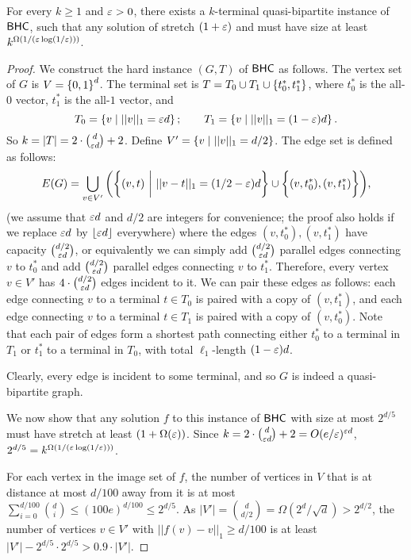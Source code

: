 \begin{lemma}
For every $k\ge 1$ and ${\varepsilon}>0$, there exists a $k$-terminal quasi-bipartite instance of $\textnormal{\textsf{BHC}}$, such that any solution of stretch $(1+{\varepsilon})$ and must have size at least $k^{\Omega(1/({\varepsilon}\log (1/{\varepsilon})))}$.
\end{lemma}

\begin{proof}
We construct the hard instance $(G,T)$ of $\textnormal{\textsf{BHC}}$  as follows. The vertex set of $G$ is $V=\left\{ 0,1 \right\}^d$. The terminal set is $T=T_0\cup T_1\cup \left\{ t^*_0,t^*_1 \right\}$, where $t^*_0$ is the all-$0$ vector, $t^*_1$ is the all-$1$ vector, and
\[
T_0=\left\{ v\mid ||v||_1={\varepsilon} d \right\}; \quad\quad T_1=\left\{ v\mid ||v||_1=(1-{\varepsilon}) d \right\}.
\]
So $k=|T|=2\cdot\binom{d}{{\varepsilon} d}+2$. Define $V'=\left\{ v\mid ||v||_1= d/2 \right\}$. The edge set is defined as follows:
\[
E(G)=\bigcup_{v\in V'}\bigg(\bigg\{(v,t)\text{ }\bigg|\text{ } ||v-t||_1=(1/2-{\varepsilon})d\bigg\}\cup \bigg\{(v,t^*_0),(v,t^*_1)\bigg\}\bigg),
\]
(we assume that ${\varepsilon} d$ and $d/2$ are integers for convenience; the proof also holds if we replace ${\varepsilon} d$ by $\left\lfloor {\varepsilon} d \right\rfloor$ everywhere)
where the edges $(v,t^*_0),(v,t^*_1)$ have capacity $\binom{d/2}{{\varepsilon} d}$, or equivalently we can simply add $\binom{d/2}{{\varepsilon} d}$ parallel edges connecting $v$ to $t^*_0$ and add $\binom{d/2}{{\varepsilon} d}$ parallel edges connecting $v$ to $t^*_1$. Therefore, every vertex $v\in V'$ has $4\cdot \binom{d/2}{{\varepsilon} d}$ edges incident to it. We can pair these edges as follows: each edge connecting $v$ to a terminal $t\in T_0$ is paired with a copy of $(v,t^*_1)$, and each edge connecting $v$ to a terminal $t\in T_1$ is paired with a copy of $(v,t^*_0)$. Note that each pair of edges form a shortest path connecting either $t^*_0$ to a terminal in $T_1$ or $t^*_1$ to a terminal in $T_0$, with total $\ell_1$-length $(1-{\varepsilon})d$.

Clearly, every edge is incident to some terminal, and so $G$ is indeed a quasi-bipartite graph.


We now show that any solution $f$ to this instance of $\textnormal{\textsf{BHC}}$ with size at most $2^{d/5}$ must have stretch at least $(1+\Omega({\varepsilon}))$. Since
$k=2\cdot\binom{d}{{\varepsilon} d}+2=O(e/{\varepsilon})^{{\varepsilon} d}$, $2^{d/5}=k^{\Omega(1/({\varepsilon}\log (1/{\varepsilon})))}$.

For each vertex in the image set of $f$, the number of vertices in $V$ that is at distance at most $d/100$ away from it is at most $\sum_{i=0}^{d/100} \binom{d}{i}\le (100e)^{d/100}\le 2^{d/5}$.
As $|V'|=\binom{d}{d/2}=\Omega(2^d/\sqrt{d})>2^{d/2}$, the number of vertices $v\in V'$ with $||f(v)-v||_1\ge d/100$ is at least
$|V'|-2^{d/5}\cdot 2^{d/5}>0.9\cdot |V'|$.


\end{proof}
